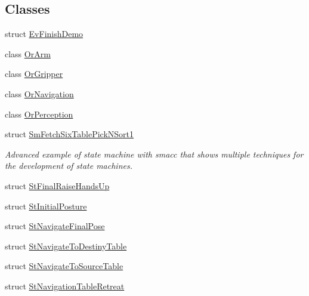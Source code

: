 \subsection*{Classes}
\begin{DoxyCompactItemize}
\item 
struct \hyperlink{structsm__fetch__six__table__pick__n__sort__1_1_1EvFinishDemo}{Ev\+Finish\+Demo}
\item 
class \hyperlink{classsm__fetch__six__table__pick__n__sort__1_1_1OrArm}{Or\+Arm}
\item 
class \hyperlink{classsm__fetch__six__table__pick__n__sort__1_1_1OrGripper}{Or\+Gripper}
\item 
class \hyperlink{classsm__fetch__six__table__pick__n__sort__1_1_1OrNavigation}{Or\+Navigation}
\item 
class \hyperlink{classsm__fetch__six__table__pick__n__sort__1_1_1OrPerception}{Or\+Perception}
\item 
struct \hyperlink{structsm__fetch__six__table__pick__n__sort__1_1_1SmFetchSixTablePickNSort1}{Sm\+Fetch\+Six\+Table\+Pick\+N\+Sort1}
\begin{DoxyCompactList}\small\item\em Advanced example of state machine with smacc that shows multiple techniques for the development of state machines. \end{DoxyCompactList}\item 
struct \hyperlink{structsm__fetch__six__table__pick__n__sort__1_1_1StFinalRaiseHandsUp}{St\+Final\+Raise\+Hands\+Up}
\item 
struct \hyperlink{structsm__fetch__six__table__pick__n__sort__1_1_1StInitialPosture}{St\+Initial\+Posture}
\item 
struct \hyperlink{structsm__fetch__six__table__pick__n__sort__1_1_1StNavigateFinalPose}{St\+Navigate\+Final\+Pose}
\item 
struct \hyperlink{structsm__fetch__six__table__pick__n__sort__1_1_1StNavigateToDestinyTable}{St\+Navigate\+To\+Destiny\+Table}
\item 
struct \hyperlink{structsm__fetch__six__table__pick__n__sort__1_1_1StNavigateToSourceTable}{St\+Navigate\+To\+Source\+Table}
\item 
struct \hyperlink{structsm__fetch__six__table__pick__n__sort__1_1_1StNavigationTableRetreat}{St\+Navigation\+Table\+Retreat}
\end{DoxyCompactItemize}
